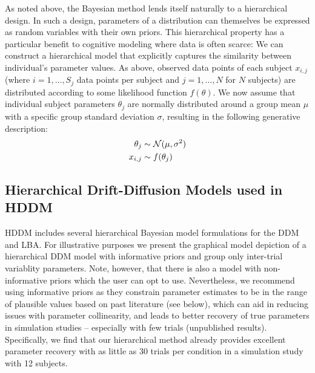 \documentclass[letterpaper,10pt,english]{article}
\begin{document}
As noted above, the Bayesian method lends itself naturally to a hierarchical design. In such a design, parameters of a distribution can themselves be expressed as random variables with their own priors. This hierarchical property has a particular benefit to cognitive modeling where data is often scarce: We can construct a hierarchical model that explicitly captures the similarity between individual's parameter values. As above, observed data points of each subject $x_{i,j}$ (where $i = 1, \dots, S_j$ data points per subject and $j = 1, \dots, N$ for $N$ subjects) are distributed according to some likelihood function $f(\theta)$.  We now assume that individual subject parameters $\theta_j$ are normally distributed around a group mean $\mu$ with a specific group standard deviation $\sigma$, resulting in the following generative description:
\begin{gather}
\begin{split}
\theta_j &\sim \mathcal{N}(\mu, \sigma^2) \\
x_{i, j} &\sim f(\theta_j)\end{split}\notag
\end{gather}

\subsection*{Hierarchical Drift-Diffusion Models used in HDDM}
\label{methods:hierarchical-drift-diffusion-models-used-in-hddm}
HDDM includes several hierarchical Bayesian model formulations for the
DDM and LBA. For illustrative purposes we present the graphical model
depiction of a hierarchical DDM model with informative priors and
group only inter-trial variablity parameters. Note, however, that
there is also a model with non-informative priors which the user can opt to use. Nevertheless, we recommend using informative priors as they constrain parameter estimates to be in the range of plausible values based on past literature (see below), which can aid in reducing issues with parameter collinearity, and leads to better recovery of true parameters in simulation studies -- especially with few trials (unpublished results). Specifically, we find that our hierarchical method already provides excellent parameter recovery with as little as 30 trials per condition in a simulation study with 12 subjects.
\end{document}
